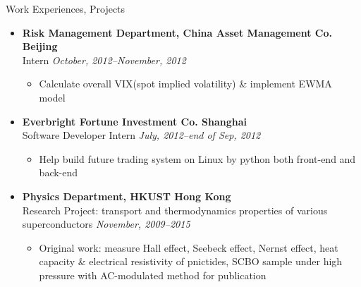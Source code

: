 \documentclass[a4paper,8pt,oneside]{scrartcl}
\newenvironment{ressection}[1]{
    \vspace{2pt}
    {\selectfont#1}
    \begin{itemize}
    \vspace{0pt}
}{
    \end{itemize}
}
\newcommand{\resitems}[1]{
    \vspace{-4pt}
    \item #1
}
\newcommand{\ressubitem}[1]{
    \vspace{0pt}
    \item #1
}
\newcommand{\resbigitem}[3]{
    \vspace{-5pt}
    \item
    \textbf{#1}\\
    #2
    \textit{#3}
}
\newenvironment{ressubsec}[3]{
    \resbigitem{#1}{#2}{#3}
    \vspace{-2pt}
    \begin{itemize}
}{
    \end{itemize}
}
\begin{document}
\begin{ressection}{Work Experiences, Projects}
    \begin{ressubsec}{Risk Management Department, China Asset Management Co. \hfill Beijing}{Intern}{\hfill October,
        2012--November, 2012} 
        \ressubitem{Calculate overall VIX(spot implied volatility) \& implement EWMA model}
    \end{ressubsec}
    \begin{ressubsec}{Everbright Fortune Investment Co. \hfill Shanghai}{Software Developer Intern}{\hfill July,
        2012--end of Sep, 2012}
      \ressubitem{Help build future trading system on Linux by python both front-end and back-end}
    \end{ressubsec}
    \begin{ressubsec}{Physics Department, HKUST \hfill Hong Kong}{Research Project: transport and thermodynamics properties of various superconductors}
      {\hfill November, 2009--2015}
      \ressubitem{Original work: measure Hall effect, Seebeck effect, Nernst effect, heat capacity \& electrical resistivity of pnictides, SCBO sample under high pressure with AC-modulated method for publication}
    \end{ressubsec}
\end{ressection}

\end{document}
